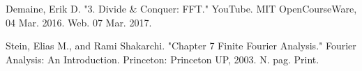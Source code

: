 \documentclass{beamer}
\begin{document}
\begin{frame}
	\begin{thebibliography}{99}
		
		Demaine, Erik D. "3. Divide \& Conquer: FFT." YouTube. MIT OpenCourseWare, 04 Mar. 2016. Web. 07 Mar. 2017.
		
		  Stein, Elias M., and Rami Shakarchi. "Chapter 7 Finite Fourier Analysis." Fourier Analysis: An Introduction. Princeton: Princeton UP, 2003. N. pag. Print.
		
	\end{thebibliography}
	
\end{frame}
\end{document}
